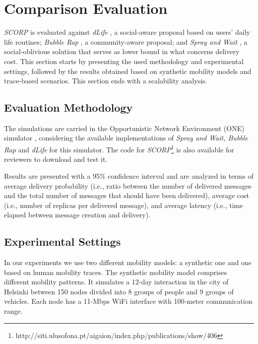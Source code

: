 \documentclass[lnicst]{svmultln}
\begin{document}
\section{Comparison Evaluation\label{sec:Comparison-Evaluation} }

\emph{SCORP} is evaluated against \emph{dLife} \cite{dlife,draftDlife},
a social-aware proposal based on users' daily life routines; \emph{Bubble
Rap} \cite{bubble2011}, a community-aware proposal; and \emph{Spray
and Wait} \cite{spraywait}, a social-oblivious solution that serves
as lower bound in what concerns delivery cost. This section starts
by presenting the used methodology and experimental settings, followed
by the results obtained based on synthetic mobility models and trace-based
scenarios. This section ends with a scalability analysis.


\subsection{Evaluation Methodology\label{sub:Evaluation-Methodology}}

The simulations are carried in the Opportunistic Network Environment
(ONE) simulator \cite{one}, considering the available implementations
of \emph{Spray and Wait, Bubble Rap }and\emph{ dLife }for this simulator. The code for \emph{SCORP}\footnote{http://siti.ulusofona.pt/aigaion/index.php/publications/show/406} is also available for reviewers to download and test it.

Results are presented with a 95\% confidence interval and are analyzed
in terms of average delivery probability (i.e., ratio between the
number of delivered messages and the total number of messages that
should have been delivered), average cost (i.e., number of replicas
per delivered message), and average latency (i.e., time elapsed between
message creation and delivery).


\subsection{Experimental Settings \label{sub:Settings}}

In our experiments we use two different mobility models: a synthetic
one and one based on human mobility traces. The synthetic mobility
model comprises different mobility patterns. It simulates a 12-day
interaction in the city of Helsinki between 150 nodes divided into
8 groups of people and 9 groups of vehicles. Each node has a 11-Mbps
WiFi interface with 100-meter communication range.
\end{document}
